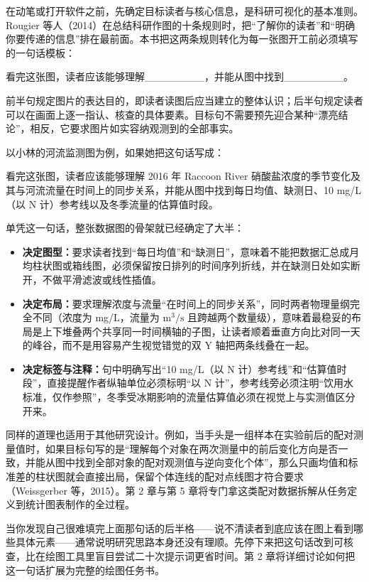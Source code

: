 在动笔或打开软件之前，先确定目标读者与核心信息，是科研可视化的基本准则。Rougier 等人（2014）在总结科研作图的十条规则时，把“了解你的读者”和“明确你要传递的信息”排在最前面。本书把这两条规则转化为每一张图开工前必须填写的一句话模板：

\begin{BookNote}
看完这张图，读者应该能够理解\_\_\_\_\_\_\_\_，并能从图中找到\_\_\_\_\_\_\_\_。
\end{BookNote}

前半句规定图片的表达目的，即读者读图后应当建立的整体认识；后半句规定读者可以在画面上逐一指认、核查的具体要素。目标句不需要预先迎合某种“漂亮结论”，相反，它要求图片如实容纳观测到的全部事实。

以小林的河流监测图为例，如果她把这句话写成：

\begin{BookNote}
看完这张图，读者应该能够理解 2016 年 Raccoon River 硝酸盐浓度的季节变化及其与河流流量在时间上的同步关系，并能从图中找到每日均值、缺测日、10 mg/L（以 N 计）参考线以及冬季流量的估算值时段。
\end{BookNote}

单凭这一句话，整张数据图的骨架就已经确定了大半：
\begin{itemize}
\item \textbf{决定图型：}要求读者找到“每日均值”和“缺测日”，意味着不能把数据汇总成月均柱状图或箱线图，必须保留按日排列的时间序列折线，并在缺测日处如实断开，不做平滑滤波或线性插值。
\item \textbf{决定布局：}要求理解浓度与流量“在时间上的同步关系”，同时两者物理量纲完全不同（浓度为 mg/L，流量为 $\text{m}^3/\text{s}$ 且跨越两个数量级），意味着最稳妥的布局是上下堆叠两个共享同一时间横轴的子图，让读者顺着垂直方向比对同一天的峰谷，而不是用容易产生视觉错觉的双 Y 轴把两条线叠在一起。
\item \textbf{决定标签与注释：}句中明确写出“10 mg/L（以 N 计）参考线”和“估算值时段”，直接提醒作者纵轴单位必须标明“以 N 计”，参考线旁必须注明“饮用水标准，仅作参照”，冬季受冰期影响的流量估算值必须在视觉上与实测值区分开来。
\end{itemize}

同样的道理也适用于其他研究设计。例如，当手头是一组样本在实验前后的配对测量值时，如果目标句写的是“理解每个对象在两次测量中的前后变化方向是否一致，并能从图中找到全部对象的配对观测值与逆向变化个体”，那么只画均值和标准差的柱状图就会直接出局，保留个体连线的配对点线图才符合要求（Weissgerber 等，2015）。第 2 章与第 5 章将专门拿这类配对数据拆解从任务定义到统计图表制作的全过程。

当你发现自己很难填完上面那句话的后半格——说不清读者到底应该在图上看到哪些具体元素——通常说明研究思路本身还没有理顺。先停下来把这句话改到可核查，比在绘图工具里盲目尝试二十次提示词更省时间。第 2 章将详细讨论如何把这一句话扩展为完整的绘图任务书。

